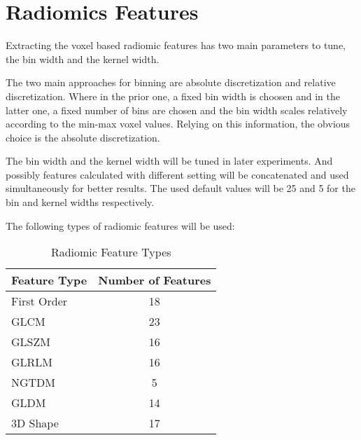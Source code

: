 \section{Radiomics Features}
Extracting the voxel based radiomic features has two main parameters to tune, the bin width and the kernel width.\par
The two main approaches for binning are absolute discretization and relative discretization. Where in the prior one, a fixed bin width is choosen and in the latter one, a fixed number of bins are chosen and the bin width scales relatively according to the min-max voxel values.  Relying on this information, the obvious choice is the absolute discretization.\par
The bin width and the kernel width will be tuned in later experiments. And possibly features calculated with different setting will be concatenated and used simultaneously for better results. The used default values will be 25 and 5 for the bin and kernel widths respectively.\par
The following types of radiomic features will be used:
\begin{table}[H]
\centering
\begin{tabular}{|l|c|}
\hline
\textbf{Feature Type} & \textbf{Number of Features} \\ \hline
First Order & 18 \\ \hline
\ac{GLCM} & 23 \\ \hline
\ac{GLSZM} & 16 \\ \hline
\ac{GLRLM} & 16 \\ \hline
\ac{NGTDM} & 5 \\ \hline
\ac{GLDM} & 14 \\ \hline
3D Shape & 17 \\ \hline
\end{tabular}
\caption{Radiomic Feature Types}
\label{tab:radf0}
\end{table}

